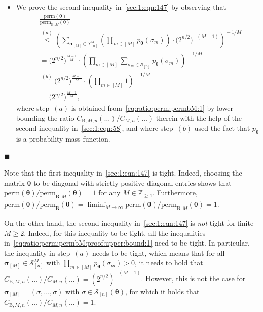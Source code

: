 \documentclass[journal,lettersize,twocolumn]{IEEEtran} %
\renewcommand\qedsymbol{$\blacksquare$}
\newcommand{\etheoremproof}{\hfill\qedsymbol}
\newcommand{\set}[1]{\mathcal{#1}}
\newcommand{\sZpp}{\mathbb{Z}_{\geq 1}}
\newcommand{\matr}[1]{ \bm{#1} }
\newcommand{\perm}{ \mathrm{perm} }
\newcommand{\permb}{ \mathrm{perm}_{\mathrm{B}} }
\newcommand{\permbM}[1]{\perm_{ \mathrm{B}, #1 }}
\newcommand{\pmtheta}{p_{\mtheta}}
\newcommand{\vsigma}{ \bm{\sigma} }
\newcommand{\setS}{\set{S}}
\newcommand{\CM}[1]{\Cgen{M}{#1}}
\newcommand{\Cgen}[2]{C_{#1,#2}}
\newcommand{\CBM}[1]{\CBgen{M}{#1}}
\newcommand{\CBgen}[2]{C_{\mathrm{B},#1,#2}}
\newcommand{\mtheta}{\matr{\theta}}
\newcommand{\vtheta}{\matr{\theta}}
\begin{document}
\begin{itemize}
\item We prove the second inequality in~\eqref{sec:1:eqn:147} by observing that
  \begin{align}
    &
    \frac{\perm(\mtheta)}
         {\permbM{M}(\mtheta)} \nonumber \\
      &\overset{(a)}{\leq}
         \left( \!
           \sum_{ \vsigma_{[M]} \in \setS_{[n]}^{M} }
             \left(
               \prod_{m \in [M]}
                 \pmtheta(\sigma_m)
             \right)
             \cdot
             \bigl( 2^{n/2} \bigr)^{-(M-1)}
         \right)^{\!\!\! -1/M} \nonumber \\
      &= \bigl( 2^{n/2} \bigr)^{\!\! \frac{M-1}{M}}
         \cdot
         \left( \!
           \prod_{m \in [M]}
             \sum_{\sigma_m \in \setS_{[n]}}
               \pmtheta(\sigma_m)
         \right)^{\!\!\! -1/M} \nonumber \\
      &\overset{(b)}{=}
         \bigl( 2^{n/2} \bigr)^{\!\! \frac{M-1}{M}}
         \cdot
         \left( \!
           \prod_{m \in [M]}
             1
         \right)^{\!\!\! -1/M} \nonumber \\
      &= \bigl( 2^{n/2} \bigr)^{\!\! \frac{M-1}{M}},
           \label{eq:ratio:perm:permbM:proof:upper:bound:1}
  \end{align}
  where step~$(a)$ is obtained from~\eqref{eq:ratio:perm:permbM:1} by lower
  bounding the ratio $\CBM{n}(\ldots) / \CM{n}(\ldots)$ therein with the help
  of the second inequality in~\eqref{sec:1:eqn:58}, and where step~$(b)$ used
  the fact that $\pmtheta$ is a probability mass function.

\end{itemize}
\etheoremproof

%

\medskip

Note that the first inequality in~\eqref{sec:1:eqn:147} is tight. Indeed,
choosing the matrix $\mtheta$ to be diagonal with strictly positive diagonal
entries shows that $\perm(\mtheta) / \permbM{M}(\mtheta) = 1$ for any
$M \in \sZpp$. Furthermore,
$\perm(\mtheta) / \permb(\mtheta) = \liminf_{M \to \infty} \perm(\mtheta) /
\permbM{M}(\mtheta)= 1$.

%

On the other hand, the second inequality in~\eqref{sec:1:eqn:147} is
\emph{not} tight for finite $M \geq 2$. Indeed, for this inequality to be
tight, all the inequalities
in~\eqref{eq:ratio:perm:permbM:proof:upper:bound:1} need to be tight. In
particular, the inequality in step~$(a)$ needs to be tight, which means that
for all $\vsigma_{[M]} \in \setS_{[n]}^{M}$ with
$\prod_{m \in [M]} \pmtheta(\sigma_m) > 0$, it needs to hold that
$\CBM{n}(\ldots) / \CM{n}(\ldots) = (2^{n/2})^{-(M-1)}$. However, this is not
the case for $\vsigma_{[M]} = (\sigma, \ldots, \sigma)$ with
$\sigma \in \setS_{[n]}(\vtheta)$, for which it holds that
$\CBM{n}(\ldots) / \CM{n}(\ldots) = 1$.
\end{document}
